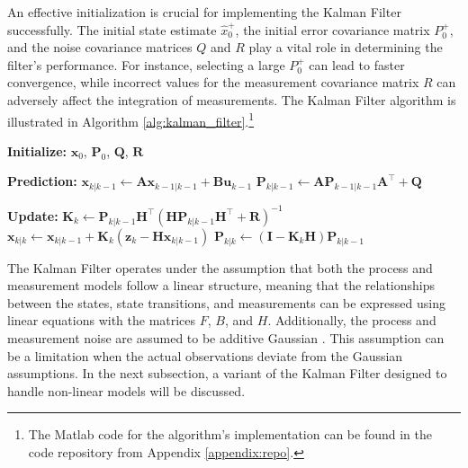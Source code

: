 An effective initialization is crucial for implementing the Kalman Filter successfully. The initial state estimate $\hat{x}^+_0$, the initial error covariance matrix $P^+_0$, and the noise covariance matrices $Q$ and $R$ play a vital role in determining the filter's performance. For instance, selecting a large $P^+_0$ can lead to faster convergence, while incorrect values for the measurement covariance matrix $R$ can adversely affect the integration of measurements. The Kalman Filter algorithm is illustrated in Algorithm \ref{alg:kalman_filter}.\footnote{The Matlab code for the algorithm's implementation can be found in the code repository from Appendix \ref{appendix:repo}.}
\newline
\begin{algorithm}[H]
\caption{Kalman Filter Algorithm for State Estimation.}
\label{alg:kalman_filter}
\begin{algorithmic}[1]
    \vspace{0.6em}
    \State \textbf{Initialize:} $\mathbf{x}_0$, $\mathbf{P}_0$, $\mathbf{Q}$, $\mathbf{R}$
    \vspace{1em}
    
    \State \textbf{Prediction:}
    \vspace{0.6em}
    \State $\mathbf{x}_{k|k-1} \gets \mathbf{A}\mathbf{x}_{k-1|k-1} + \mathbf{B}\mathbf{u}_{k-1}$
    \vspace{0.6em}
    \State $\mathbf{P}_{k|k-1} \gets \mathbf{A}\mathbf{P}_{k-1|k-1}\mathbf{A}^\top + \mathbf{Q}$
    \vspace{1em}
    
    \State \textbf{Update:}
    \vspace{0.6em}
    \State $\mathbf{K}_k \gets \mathbf{P}_{k|k-1}\mathbf{H}^\top(\mathbf{H}\mathbf{P}_{k|k-1}\mathbf{H}^\top + \mathbf{R})^{-1}$
    \vspace{0.6em}
        \vspace{0.3em}
        \State $\mathbf{x}_{k|k} \gets \mathbf{x}_{k|k-1} + \mathbf{K}_k(\mathbf{z}_k - \mathbf{H}\mathbf{x}_{k|k-1})$
        \vspace{0.3em}
    \EndIf
    \vspace{0.6em}
    \State $\mathbf{P}_{k|k} \gets (\mathbf{I} - \mathbf{K}_k\mathbf{H})\mathbf{P}_{k|k-1}$
    \vspace{0.6em}
\end{algorithmic}
\end{algorithm}

The Kalman Filter operates under the assumption that both the process and measurement models follow a linear structure, meaning that the relationships between the states, state transitions, and measurements can be expressed using linear equations with the matrices $F$, $B$, and $H$. Additionally, the process and measurement noise are assumed to be additive Gaussian \cite{Kim}. This assumption can be a limitation when the actual observations deviate from the Gaussian assumptions. In the next subsection, a variant of the Kalman Filter designed to handle non-linear models will be discussed.

